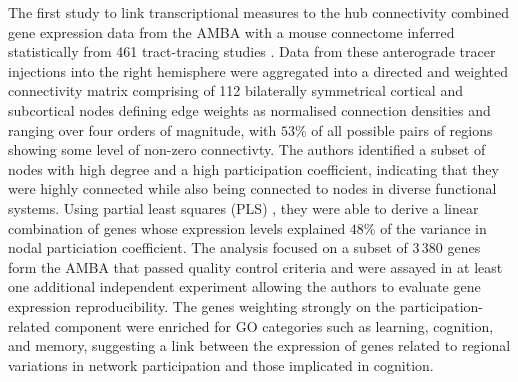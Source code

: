 The first study to link transcriptional measures to the hub connectivity \citep{Rubinov2015c} combined gene expression data from the AMBA \citep{Lein2007a} with a mouse connectome inferred statistically from 461 tract-tracing studies \citep{Oh2014}.
Data from these anterograde tracer injections into the right hemisphere were aggregated into a directed and weighted connectivity matrix comprising of 112 bilaterally symmetrical cortical and subcortical nodes defining edge weights as normalised connection densities and ranging over four orders of magnitude, with $53$\% of all possible pairs of regions showing some level of non-zero connectivty.
The authors identified a subset of nodes with high degree and a high participation coefficient, indicating that they were highly connected while also being connected to nodes in diverse functional systems.
Using partial least squares (PLS) \citep{Herve2010}, they were able to derive a linear combination of genes whose expression levels explained $48$\% of the variance in nodal particiation coefficient. The analysis focused on a subset of 3\,380 genes form the AMBA that passed quality control criteria and were assayed in at least one additional independent experiment allowing the authors to evaluate gene expression reproducibility. The genes weighting strongly on the participation-related component were enriched for GO categories such as learning, cognition, and memory, suggesting a link between the expression of genes related to regional variations in network participation and those implicated in cognition.

